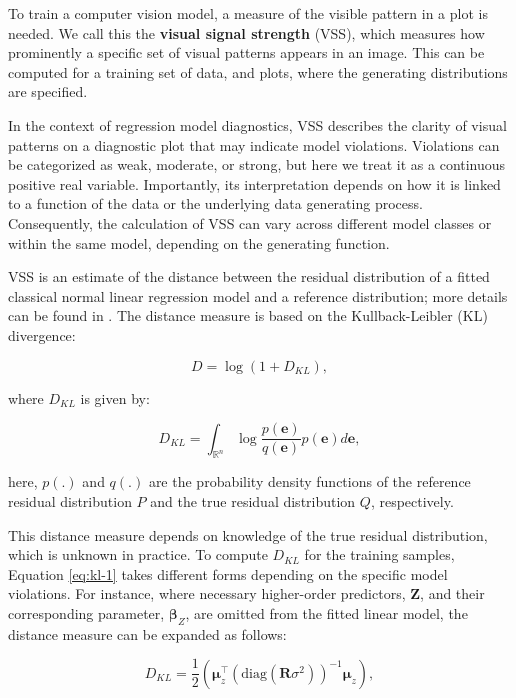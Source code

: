 \documentclass[
doublespace,
  times]{anzsauth}
\begin{document}
To train a computer vision model, a measure of the visible pattern in a
plot is needed. We call this the \textbf{visual signal strength} (VSS),
which measures how prominently a specific set of visual patterns appears
in an image. This can be computed for a training set of data, and plots,
where the generating distributions are specified.

In the context of regression model diagnostics, VSS describes the
clarity of visual patterns on a diagnostic plot that may indicate model
violations. Violations can be categorized as weak, moderate, or strong,
but here we treat it as a continuous positive real variable.
Importantly, its interpretation depends on how it is linked to a
function of the data or the underlying data generating process.
Consequently, the calculation of VSS can vary across different model
classes or within the same model, depending on the generating function.

VSS is an estimate of the distance between the residual distribution of
a fitted classical normal linear regression model and a reference
distribution; more details can be found in \citet{li2024automated}. The
distance measure is based on the Kullback-Leibler (KL) divergence:

\begin{equation*} \label{eq:kl-0}
D = \log\left(1 + D_{KL}\right),
\end{equation*}

where \(D_{KL}\) is given by:

\begin{equation} \label{eq:kl-1}
D_{KL} = \int_{\mathbb{R}^{n}}\log\frac{p(\boldsymbol{e})}{q(\boldsymbol{e})}p(\boldsymbol{e})d\boldsymbol{e},
\end{equation}

here, \(p(.)\) and \(q(.)\) are the probability density functions of the
reference residual distribution \(P\) and the true residual distribution
\(Q\), respectively.

This distance measure depends on knowledge of the true residual
distribution, which is unknown in practice. To compute \(D_{KL}\) for
the training samples, Equation \ref{eq:kl-1} takes different forms
depending on the specific model violations. For instance, where
necessary higher-order predictors, \(\boldsymbol{Z}\), and their
corresponding parameter, \(\boldsymbol{\beta}_Z\), are omitted from the
fitted linear model, the distance measure can be expanded as follows:

\begin{equation*} \label{eq:kl-2}
D_{KL} = \frac{1}{2}\left(\boldsymbol{\mu}_z^\top(\text{diag}(\boldsymbol{R}\sigma^2))^{-1}\boldsymbol{\mu}_z\right),
\end{equation*}
\end{document}
